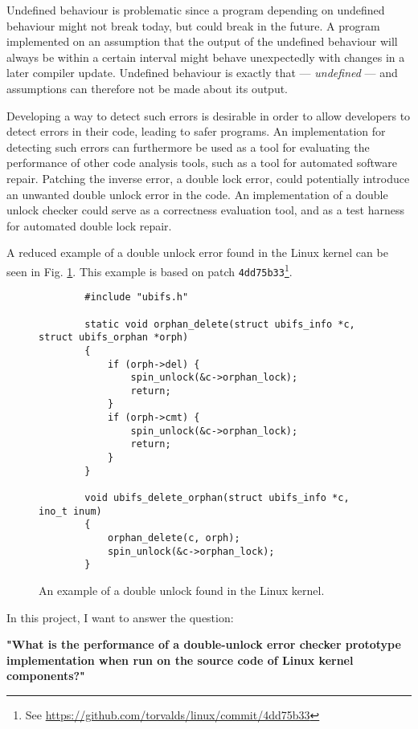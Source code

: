 \newpar Undefined behaviour is problematic since a program depending on undefined behaviour might not break today, but could break in the future. A program implemented on an assumption that the output of the undefined behaviour will always be within a certain interval might behave unexpectedly with changes in a later compiler update. Undefined behaviour is exactly that --- \textit{undefined} --- and assumptions can therefore not be made about its output.

\newpar Developing a way to detect such errors is desirable in order to allow developers to detect errors in their code, leading to safer programs. An implementation for detecting such errors can furthermore be used as a tool for evaluating the performance of other code analysis tools, such as a tool for automated software repair. Patching the inverse error, a double lock error, could potentially introduce an unwanted double unlock error in the code. An implementation of a double unlock checker could serve as a correctness evaluation tool, and as a test harness for automated double lock repair.

\newpar A reduced example of a double unlock error found in the Linux kernel can be seen in Fig. \ref{fig:introexample}. This example is based on patch \texttt{4dd75b33}\footnote{See \url{https://github.com/torvalds/linux/commit/4dd75b33}}.

\begin{figure}[H]
    \centering
    \begin{verbatim}
        #include "ubifs.h"

        static void orphan_delete(struct ubifs_info *c, struct ubifs_orphan *orph)
        {
            if (orph->del) {
                spin_unlock(&c->orphan_lock);
                return;
            }
            if (orph->cmt) {
                spin_unlock(&c->orphan_lock);
                return;
            }
        }
        
        void ubifs_delete_orphan(struct ubifs_info *c, ino_t inum)
        {
            orphan_delete(c, orph);
            spin_unlock(&c->orphan_lock);
        }
    \end{verbatim}
    \caption{An example of a double unlock found in the Linux kernel.}
    \label{fig:introexample}
\end{figure}
\newpar In this project, I want to answer the question:

\begin{center}
    \textbf{"What is the performance of a double-unlock error checker prototype implementation when run on the source code of Linux kernel components?"} 
\end{center}

